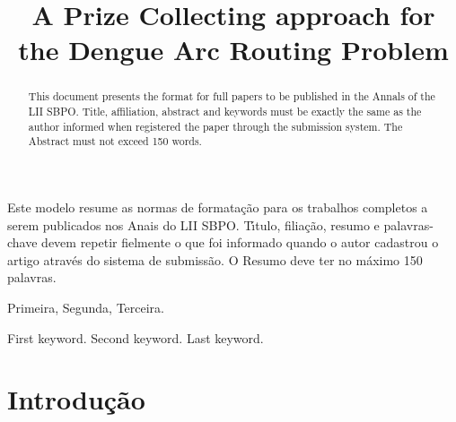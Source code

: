 \documentclass[a4paper,11pt]{article}
\begin{document}
\title{A Prize Collecting approach for the Dengue Arc Routing Problem} 

\maketitle
\thispagestyle{fancy}

\author{
}

\author{ 
}

\vspace{8mm}
\begin{resumo}
Este modelo resume as normas de formata\c c\~ao para os trabalhos completos a serem publicados
nos Anais do LII SBPO. T\'\i tulo, filia\c c\~ao, resumo e palavras-chave devem repetir fielmente
o que foi informado quando o autor cadastrou o artigo atrav\' es do sistema de submiss\~ao.
O Resumo deve ter no m\' aximo 150 palavras.
 \end{resumo}

\bigskip
\begin{palchaves}
Primeira, Segunda, Terceira.

\bigskip
{}
\end{palchaves}


\vspace{8mm}

\begin{abstract}
This document presents the format for full papers to be published in the Annals of the LII SBPO.
Title, affiliation, abstract and keywords must be exactly the same as the author informed when registered the paper through the submission system. 
The Abstract must not exceed 150 words.
\end{abstract}

\bigskip
\begin{keywords}
First keyword. Second keyword. Last keyword.

\bigskip
{}
\end{keywords}

 
\newpage
\section{Introdu\c{c}\~ao} 
 
\end{document}
